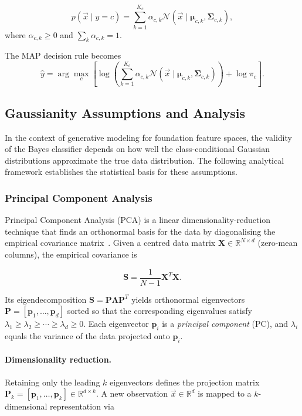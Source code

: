 \begin{equation}
	p(\vec{x} \mid y=c)
	=
	\sum_{k=1}^{K_c}
	\alpha_{c,k}
	\mathcal{N}(\vec{x} \mid \boldsymbol{\mu}_{c,k}, \boldsymbol{\Sigma}_{c,k}),
\end{equation}
where $\alpha_{c,k} \ge 0$ and $\sum_k \alpha_{c,k} = 1$.

The MAP decision rule becomes
\begin{equation}
	\hat{y}
	=
	\arg\max_c
	\left[
	\log
	\left(
	\sum_{k=1}^{K_c}
	\alpha_{c,k}
	\mathcal{N}(\vec{x} \mid \boldsymbol{\mu}_{c,k}, \boldsymbol{\Sigma}_{c,k})
	\right)
	+
	\log \pi_c
	\right].
\end{equation}

\subsection{Gaussianity Assumptions and Analysis}
In the context of generative modeling for foundation feature spaces, the validity of the Bayes classifier depends on how well the class-conditional Gaussian distributions approximate the true data distribution. The following analytical framework establishes the statistical basis for these assumptions.

\subsubsection{Principal Component Analysis}
\label{sec:marco:pca}

Principal Component Analysis (PCA) is a linear dimensionality-reduction technique that finds an orthonormal basis for the data by diagonalising the empirical covariance matrix~\cite{jolliffe2002principal}. Given a centred data matrix $\mathbf{X} \in \mathbb{R}^{N \times d}$ (zero-mean columns), the empirical covariance is

\begin{equation}
\mathbf{S} = \frac{1}{N-1}\mathbf{X}^{T}\mathbf{X}.
\end{equation}

Its eigendecomposition $\mathbf{S} = \mathbf{P}\boldsymbol{\Lambda}\mathbf{P}^{T}$ yields orthonormal eigenvectors $\mathbf{P} = [\mathbf{p}_1, \ldots, \mathbf{p}_d]$ sorted so that the corresponding eigenvalues satisfy $\lambda_1 \ge \lambda_2 \ge \cdots \ge \lambda_d \ge 0$. Each eigenvector $\mathbf{p}_i$ is a \emph{principal component} (PC), and $\lambda_i$ equals the variance of the data projected onto $\mathbf{p}_i$.

\paragraph{Dimensionality reduction.}
Retaining only the leading $k$ eigenvectors defines the projection matrix $\mathbf{P}_k = [\mathbf{p}_1, \ldots, \mathbf{p}_k] \in \mathbb{R}^{d \times k}$. A new observation $\vec{x} \in \mathbb{R}^d$ is mapped to a $k$-dimensional representation via


